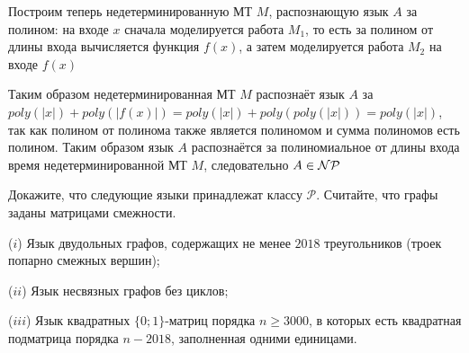 \documentclass[a4paper,12pt]{article}
\begin{document}
\begin{solution}
\begin{enumerate}
		Построим теперь недетерминированную МТ $M$, распознающую язык $A$ за полином: на входе $x$ сначала моделируется работа $M_1$, то есть за полином от длины входа вычисляется функция $f(x)$, а затем моделируется работа $M_2$ на входе $f(x)$
		
		Таким образом недетерминированная МТ $M$ распознаёт язык $A$ за $poly(|x|) + poly(|f(x)|) = poly(|x|) + poly(poly(|x|)) = poly(|x|)$, так как полином от полинома также является полиномом и сумма полиномов есть полином. Таким образом язык $A$ распознаётся за полиномиальное от длины входа время недетерминированной МТ $M$, следовательно $A \in \mathcal{NP}$
		
	\end{enumerate}

\end{solution}

\begin{tasknum}{2}
	Докажите, что следующие языки принадлежат классу $\mathcal{P}$. Считайте, что графы заданы матрицами смежности.
	
	($i$) Язык двудольных графов, содержащих не менее $2018$ треугольников (троек попарно смежных вершин);
	
	($ii$) Язык несвязных графов без циклов;
	
	($iii$) Язык квадратных $\{0; 1\}$-матриц порядка $n\geq 3000$, в которых есть квадратная подматрица порядка $n-2018$, заполненная одними единицами.
\end{tasknum}
\end{document}
